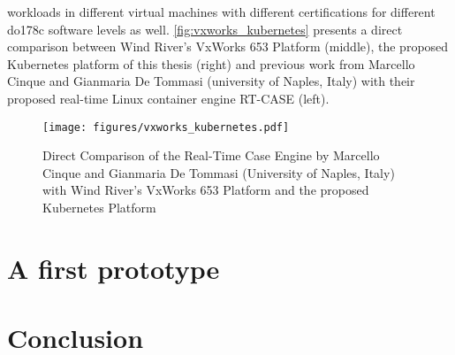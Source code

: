 \documentclass[titlepage]{report}
\begin{document}
workloads in different virtual machines with different certifications for different \gls{do178c} software levels as well\cite{VXWorks653}. \autoref{fig:vxworks_kubernetes} presents a direct comparison between Wind River's VxWorks 653 Platform (middle),
the proposed Kubernetes platform of this thesis (right) and previous work from Marcello Cinque and Gianmaria De Tommasi (university of Naples, Italy) with their proposed real-time Linux container engine RT-CASE (left).
\begin{figure}[H]
  \centering
  \texttt{[image: figures/vxworks\_kubernetes.pdf]}
  \caption{Direct Comparison of the Real-Time Case Engine by Marcello Cinque and Gianmaria De Tommasi (University of Naples, Italy) with Wind River's VxWorks 653 Platform and the proposed Kubernetes Platform\cite{cinque2017work}\cite{VXWorks653}\cite{VXWorks653Platform}}\label{fig:vxworks_kubernetes}
\end{figure}
\chapter{A first prototype}
\chapter{Conclusion}

\nocite{*}
\lstlistoflistings{}
\listoffigures
\printbibliography{}
\glsaddallunused
\printglossary{}
\end{document}
